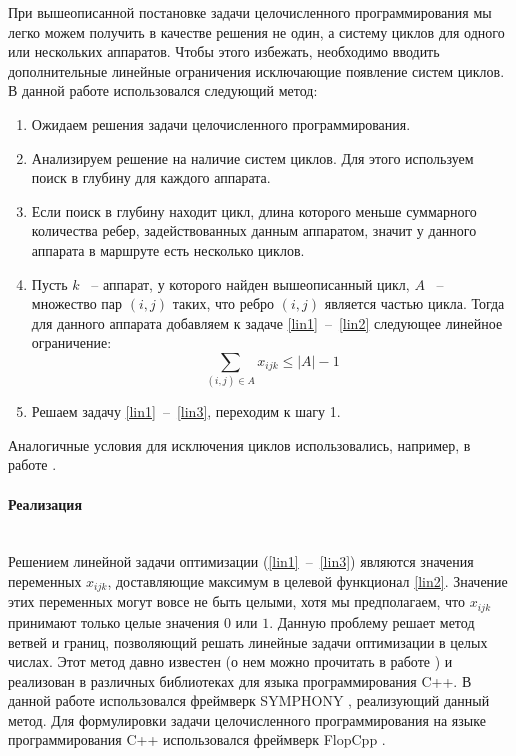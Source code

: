 \documentclass[a4paper,14pt,russian]{article}
\begin{document}
При вышеописанной постановке задачи целочисленного программирования мы легко можем получить в качестве решения не один, а систему циклов для одного или нескольких аппаратов. Чтобы этого избежать, необходимо вводить дополнительные линейные ограничения исключающие появление систем циклов. В данной работе использовался следующий метод:
\begin{enumerate}
\item  Ожидаем решения задачи целочисленного программирования.
\item Анализируем решение на наличие систем циклов. Для этого используем поиск в глубину для каждого аппарата.
\item Если поиск в глубину находит цикл, длина которого меньше суммарного количества ребер, задействованных данным аппаратом, значит у данного аппарата в маршруте есть несколько циклов.
\item Пусть $k$ ~-- аппарат, у которого найден вышеописанный цикл, $A$ ~-- множество пар $(i, j)$ таких, что ребро $(i, j)$ является частью цикла. Тогда для данного аппарата добавляем к задаче \eqref{lin1}~--~\eqref{lin2} следующее линейное ограничение:
\begin{equation} \label{lin3}
\displaystyle \sum_{(i,j) \in A} x_{i j k} \le |A| - 1
\end{equation}

\item Решаем задачу \eqref{lin1}~--~\eqref{lin3}, переходим к шагу 1.
\end{enumerate}

Аналогичные условия для исключения циклов использовались, например, в работе \cite{shmoys1990analyzing}.

\paragraph{Реализация} ~\\
Решением линейной задачи оптимизации (\eqref{lin1}~--~\eqref{lin3}) являются значения переменных  $x_{i j k}$, доставляющие максимум в целевой функционал \eqref{lin2}.
Значение этих переменных могут вовсе не быть целыми, хотя мы предполагаем, что $x_{i j k}$ принимают только целые значения $0$ или $1$. Данную проблему решает метод ветвей и границ, позволяющий решать линейные задачи оптимизации в целых числах. Этот метод давно известен (о нем можно прочитать в работе \cite{lawler1966branch}) и реализован в различных библиотеках для языка программирования C++.
В данной работе использовался фреймверк SYMPHONY \cite{ralphs2005symphony}, реализующий данный метод.
Для формулировки задачи целочисленного программирования на языке программирования C++ использовался фреймверк FlopCpp \cite{hultberg2007flopc++}.
\end{document}
